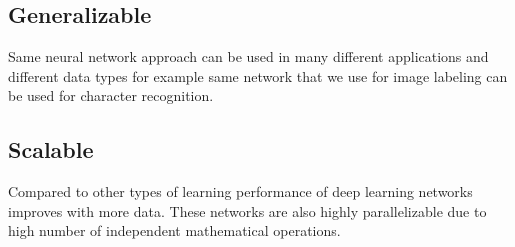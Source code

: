 \subsection{Generalizable}
Same neural network approach can be used in many different applications and different data types for example same network that we use for image labeling can be used for character recognition.
\subsection{Scalable}
Compared to other types of learning performance of deep learning networks improves with more data. These networks are also highly parallelizable due to high number of independent mathematical operations.
